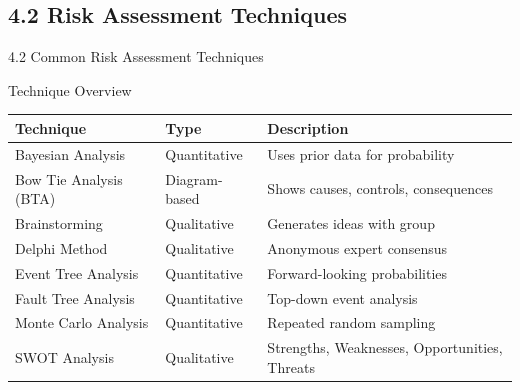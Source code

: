 \documentclass[9pt]{beamer}  %
\begin{document}
	\subsection{4.2 Risk Assessment Techniques}
	\begin{frame}{4.2 Common Risk Assessment Techniques}
		\begin{block}{Technique Overview}
			\begin{tabular}{|p{2.5cm}|p{4cm}|p{4.5cm}|}
				\hline
				\textbf{Technique} & \textbf{Type} & \textbf{Description} \\
				\hline
				Bayesian Analysis & Quantitative & Uses prior data for probability \\
				\hline
				Bow Tie Analysis (BTA) & Diagram-based & Shows causes, controls, consequences \\
				\hline
				Brainstorming & Qualitative & Generates ideas with group \\
				\hline
				Delphi Method & Qualitative & Anonymous expert consensus \\
				\hline
				Event Tree Analysis & Quantitative & Forward-looking probabilities \\
				\hline
				Fault Tree Analysis & Quantitative & Top-down event analysis \\
				\hline
				Monte Carlo Analysis & Quantitative & Repeated random sampling \\
				\hline
				SWOT Analysis & Qualitative & Strengths, Weaknesses, Opportunities, Threats \\
				\hline
			\end{tabular}
		\end{block}
	\end{frame}
	
\end{document}
